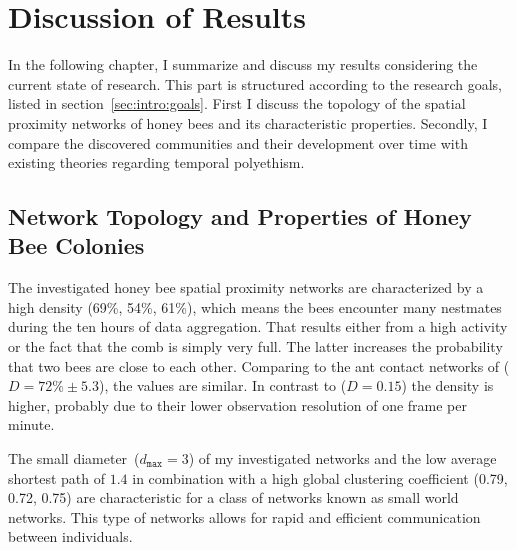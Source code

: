 \section{Discussion of Results}

In the following chapter, I summarize and discuss my results considering the current state of research.
This part is structured according to the research goals, listed in section~\ref{sec:intro:goals}.
First I discuss the topology of the spatial proximity networks of honey bees and its characteristic properties.
Secondly, I compare the discovered communities and their development over time with existing theories regarding temporal polyethism.


\subsection{Network Topology and Properties of Honey Bee Colonies}
The investigated honey bee spatial proximity networks are characterized by a high density (69\%, 54\%, 61\%), which means the bees encounter many nestmates during the ten hours of data aggregation.
That results either from a high activity or the fact that the comb is simply very full.
The latter increases the probability that two bees are close to each other. 
Comparing to the ant contact networks of \textcite{mersch2013tracking} ($D = 72\%\pm5.3$), the values are similar. In contrast to \textcite{baracchi2014socio} ($D=0.15$) the density is higher, probably due to their lower observation resolution of one frame per minute.


The small diameter~($d_{\texttt{max}}=3$) of my investigated networks and the low average shortest path of $1.4$ in combination with a high global clustering coefficient (0.79, 0.72, 0.75) are characteristic for a class of networks known as small world networks.
This type of networks allows for rapid and efficient communication between individuals.


